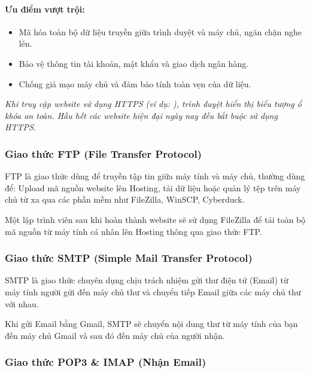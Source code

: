 \paragraph{Ưu điểm vượt trội:}
\begin{itemize}[leftmargin=1.8em, itemsep=2pt, parsep=0pt]
    \item Mã hóa toàn bộ dữ liệu truyền giữa trình duyệt và máy chủ, ngăn chặn nghe lén.
    \item Bảo vệ thông tin tài khoản, mật khẩu và giao dịch ngân hàng.
    \item Chống giả mạo máy chủ và đảm bảo tính toàn vẹn của dữ liệu.
\end{itemize}
\textit{Khi truy cập website sử dụng HTTPS (ví dụ: ), trình duyệt hiển thị biểu tượng ổ khóa an toàn. Hầu hết các website hiện đại ngày nay đều bắt buộc sử dụng HTTPS.}

\subsubsection{Giao thức FTP (File Transfer Protocol)}

FTP là giao thức dùng để truyền tập tin giữa máy tính và máy chủ, thường dùng để: Upload mã nguồn website lên Hosting, tải dữ liệu hoặc quản lý tệp trên máy chủ từ xa qua các phần mềm như FileZilla, WinSCP, Cyberduck.

\begin{tipBox}
Một lập trình viên sau khi hoàn thành website sẽ sử dụng FileZilla để tải toàn bộ mã nguồn từ máy tính cá nhân lên Hosting thông qua giao thức FTP.
\end{tipBox}

\subsubsection{Giao thức SMTP (Simple Mail Transfer Protocol)}

SMTP là giao thức chuyên dụng chịu trách nhiệm gửi thư điện tử (Email) từ máy tính người gửi đến máy chủ thư và chuyển tiếp Email giữa các máy chủ thư với nhau.

\begin{noteBox}[Ví dụ về SMTP]
Khi gửi Email bằng Gmail, SMTP sẽ chuyển nội dung thư từ máy tính của bạn đến máy chủ Gmail và sau đó đến máy chủ của người nhận.
\end{noteBox}

\subsubsection{Giao thức POP3 \& IMAP (Nhận Email)}

